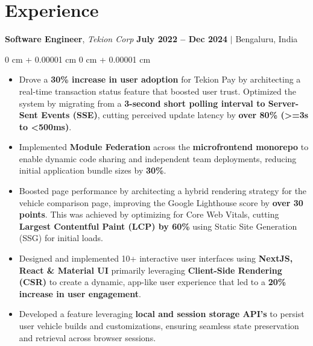 \documentclass[10pt, letterpaper]{article}
\newenvironment{highlights}{
    \begin{itemize}[
        topsep=0.10 cm,     %
        parsep=0.10 cm,     %
        partopsep=0pt,      %
        itemsep=0pt,        %
        leftmargin=0 cm + 10pt  %
    ]
}{
    \end{itemize}
}
\newenvironment{onecolentry}{
    \begin{adjustwidth}{
        0 cm + 0.00001 cm
    }{
        0 cm + 0.00001 cm
    }
}{
    \end{adjustwidth}
}
\begin{document}
        \vspace{0.1cm}


    \section{Experience}

        \noindent
        \textbf{Software Engineer}, {\color{darkgray}\textit{Tekion Corp}} \hfill {\color{darkgray}\small{\textbf{July 2022 – Dec 2024} $|$ Bengaluru, India }}

        \vspace{0.20 cm}
        \begin{onecolentry}
            \begin{highlights}
                \item Drove a \textbf{30\% increase in user adoption} for Tekion Pay by architecting a real-time transaction status feature that boosted user trust. Optimized the system by migrating from a \textbf{3-second short polling interval to Server-Sent Events (SSE)}, cutting perceived update latency by \textbf{over 80\% (>=3s to <500ms)}.
                \item Implemented \textbf{Module Federation} across the \textbf{microfrontend monorepo} to enable dynamic code sharing and independent team deployments, reducing initial application bundle sizes by \textbf{30\%}.
                \item Boosted page performance by architecting a hybrid rendering strategy for the vehicle comparison page, improving the Google Lighthouse score by \textbf{over 30 points}. This was achieved by optimizing for Core Web Vitals, cutting \textbf{Largest Contentful Paint (LCP) by 60\%} using Static Site Generation (SSG) for initial loads.
                \item Designed and implemented 10+ interactive user interfaces using \textbf{NextJS, React \& Material UI} primarily leveraging \textbf{Client-Side Rendering (CSR)} to create a dynamic, app-like user experience that led to a \textbf{20\% increase in user engagement}.
                \item Developed a feature leveraging \textbf{local and session storage API's} to persist user vehicle builds and customizations, ensuring seamless state preservation and retrieval across browser sessions.
            \end{highlights}
        \end{onecolentry}
\end{document}
